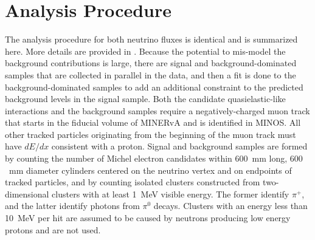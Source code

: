 \documentclass[aps,prl,twocolumn,showpacs,superscriptaddress, floatfix,10pt]{revtex4-2}
\begin{document}
\section{Analysis Procedure}

The analysis procedure for both neutrino fluxes is identical and is summarized here.  More details are provided in \cite{MINERvA:2022mnw}.  Because the potential to mis-model the background contributions is large, there are signal and background-dominated samples that are collected in parallel in the data, and then a fit is done to the background-dominated samples to add an additional constraint to the predicted background levels in the signal sample.  Both the 
 candidate quasielastic-like interactions and the background samples require a negatively-charged muon track that starts in the fiducial volume of MINERvA and is identified in MINOS.  All other tracked particles originating from the beginning of the muon track must have $dE/dx$ consistent with a proton.  
Signal and background samples 
are formed by counting the number of Michel electron candidates within $600$~mm long, $600$~mm diameter cylinders centered on the neutrino vertex and on endpoints of tracked particles, and by counting isolated clusters constructed from two-dimensional clusters with at least 1~MeV visible energy. The former identify $\pi^+$, and the latter identify photons from $\pi^0$ decays. Clusters with an energy less than 10~MeV per hit are assumed to
be caused by neutrons producing low energy protons and are not used. 
\end{document}
